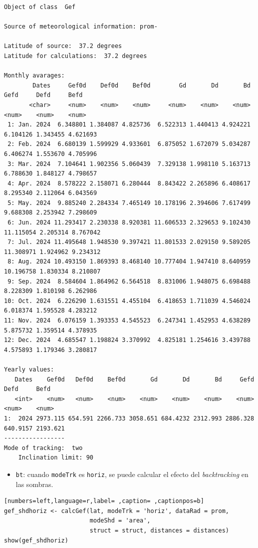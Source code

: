 \begin{verbatim}
Object of class  Gef 

Source of meteorological information: prom- 

Latitude of source:  37.2 degrees
Latitude for calculations:  37.2 degrees

Monthly avarages:
        Dates     Gef0d    Def0d    Bef0d        Gd       Dd       Bd      Gefd     Defd     Befd
       <char>     <num>    <num>    <num>     <num>    <num>    <num>     <num>    <num>    <num>
 1: Jan. 2024  6.348801 1.384087 4.825736  6.522313 1.440413 4.924221  6.104126 1.343455 4.621693
 2: Feb. 2024  6.680139 1.599929 4.933601  6.875052 1.672079 5.034287  6.406274 1.553670 4.705996
 3: Mar. 2024  7.104641 1.902356 5.060439  7.329138 1.998110 5.163713  6.788630 1.848127 4.798657
 4: Apr. 2024  8.578222 2.158071 6.280444  8.843422 2.265896 6.408617  8.295340 2.112064 6.043569
 5: May. 2024  9.885240 2.284334 7.465149 10.178196 2.394606 7.617499  9.688308 2.253942 7.298609
 6: Jun. 2024 11.293417 2.230338 8.920381 11.606533 2.329653 9.102430 11.115054 2.205314 8.767042
 7: Jul. 2024 11.495648 1.948530 9.397421 11.801533 2.029150 9.589205 11.308971 1.924962 9.234312
 8: Aug. 2024 10.493150 1.869393 8.468140 10.777404 1.947410 8.640959 10.196758 1.830334 8.210807
 9: Sep. 2024  8.584604 1.864962 6.564518  8.831006 1.948075 6.698488  8.228309 1.810198 6.262986
10: Oct. 2024  6.226290 1.631551 4.455104  6.418653 1.711039 4.546024  6.018374 1.595528 4.283212
11: Nov. 2024  6.076159 1.393353 4.545523  6.247341 1.452953 4.638289  5.875732 1.359514 4.378935
12: Dec. 2024  4.685547 1.198824 3.370992  4.825181 1.254616 3.439788  4.575893 1.179346 3.280817

Yearly values:
   Dates    Gef0d   Def0d    Bef0d       Gd       Dd       Bd     Gefd     Defd     Befd
   <int>    <num>   <num>    <num>    <num>    <num>    <num>    <num>    <num>    <num>
1:  2024 2973.115 654.591 2266.733 3058.651 684.4232 2312.993 2886.328 640.9157 2193.621
-----------------
Mode of tracking:  two 
    Inclination limit: 90
\end{verbatim}

\begin{itemize}
\item \texttt{bt}: cuando \texttt{modeTrk} es \texttt{horiz}, se puede calcular el efecto del \emph{backtracking} en las sombras.
\end{itemize}
\begin{lstlisting}[numbers=left,language=r,label= ,caption= ,captionpos=b]
gef_shdhoriz <- calcGef(lat, modeTrk = 'horiz', dataRad = prom,
                        modeShd = 'area',
                        struct = struct, distances = distances)
show(gef_shdhoriz)
\end{lstlisting}

